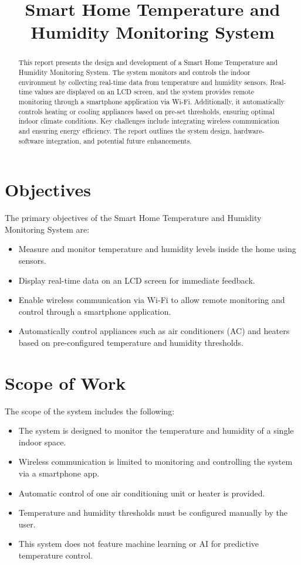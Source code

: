 \documentclass[a4paper,12pt]{article}
\title{Smart Home Temperature and Humidity Monitoring System}
\author{}
\date{}
\begin{document}
\maketitle

\begin{abstract}
This report presents the design and development of a Smart Home Temperature and Humidity Monitoring System. The system monitors and controls the indoor environment by collecting real-time data from temperature and humidity sensors. Real-time values are displayed on an LCD screen, and the system provides remote monitoring through a smartphone application via Wi-Fi. Additionally, it automatically controls heating or cooling appliances based on pre-set thresholds, ensuring optimal indoor climate conditions. Key challenges include integrating wireless communication and ensuring energy efficiency. The report outlines the system design, hardware-software integration, and potential future enhancements.
\end{abstract}

\section{Objectives}
The primary objectives of the Smart Home Temperature and Humidity Monitoring System are:
\begin{itemize}
    \item Measure and monitor temperature and humidity levels inside the home using sensors.
    \item Display real-time data on an LCD screen for immediate feedback.
    \item Enable wireless communication via Wi-Fi to allow remote monitoring and control through a smartphone application.
    \item Automatically control appliances such as air conditioners (AC) and heaters based on pre-configured temperature and humidity thresholds.
\end{itemize}

\section{Scope of Work}
The scope of the system includes the following:
\begin{itemize}
    \item The system is designed to monitor the temperature and humidity of a single indoor space.
    \item Wireless communication is limited to monitoring and controlling the system via a smartphone app.
    \item Automatic control of one air conditioning unit or heater is provided.
    \item Temperature and humidity thresholds must be configured manually by the user.
    \item This system does not feature machine learning or AI for predictive temperature control.
\end{itemize}
\end{document}
